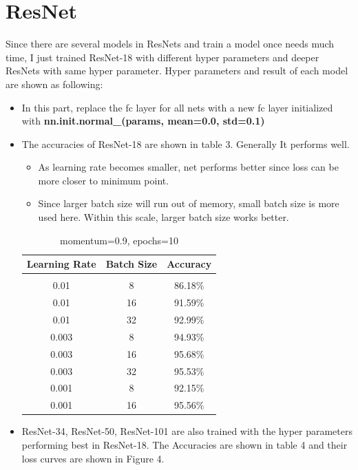\documentclass{article} %
\begin{document}
\begin{itemize}
\end{itemize}

\section{ResNet}

Since there are several models in ResNets and train a model once needs much time, I just trained ResNet-18 with different hyper parameters and deeper ResNets with same hyper parameter. Hyper parameters and result of each model are shown as following:
 
\begin{itemize}
\item In this part, replace the fc layer for all nets with a new fc layer initialized with \textbf{nn.init.normal\_(params, mean=0.0, std=0.1)}
\item The accuracies of ResNet-18 are shown in table 3. Generally It performs well.
\begin{itemize}
\item As learning rate becomes smaller, net performs better since loss can be more closer to minimum point.
\item Since larger batch size will run out of memory, small batch size is more used here. Within this scale, larger batch size works better.
\end{itemize}

\begin{table}[h]
\caption{momentum=0.9, epochs=10}
\begin{center}
\begin{tabular}{c|c|c}
\multicolumn{1}{c}{\bf Learning Rate} & \multicolumn{1}{c}{\bf Batch Size} &\multicolumn{1}{c}{\bf Accuracy}
\\ \hline \\
0.01 & 8 & 86.18\% \\
0.01 & 16 & 91.59\% \\
0.01 & 32 & 92.99\% \\
0.003 & 8 & 94.93\% \\
0.003 & 16 & 95.68\% \\
0.003 & 32 & 95.53\% \\
0.001 & 8 & 92.15\% \\
0.001 & 16 & 95.56\% \\
\end{tabular}
\end{center}
\end{table}

\item ResNet-34, ResNet-50, ResNet-101 are also trained with the hyper parameters performing best in ResNet-18. The Accuracies are shown in table 4 and their loss curves are shown in Figure 4.


\end{itemize}
\end{document}
